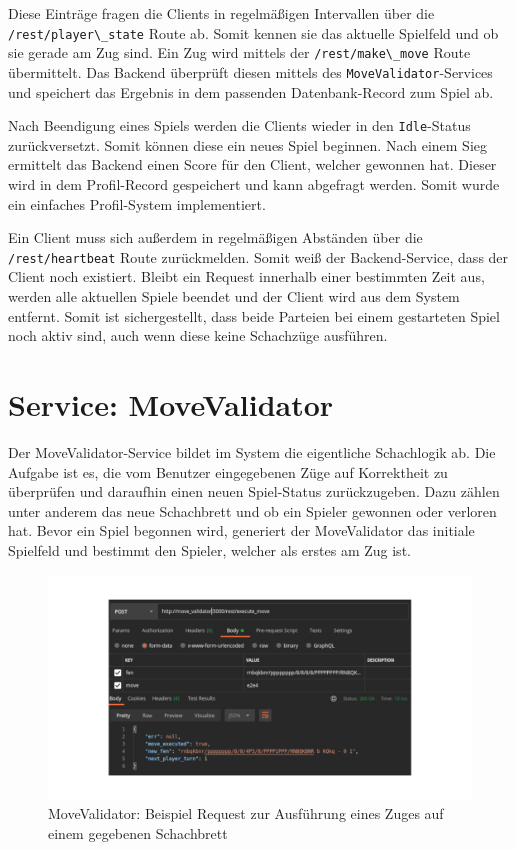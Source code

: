 Diese Einträge fragen die Clients in regelmäßigen Intervallen über die
\passthrough{\lstinline!/rest/player\_state!} Route ab. Somit kennen sie
das aktuelle Spielfeld und ob sie gerade am Zug sind. Ein Zug wird
mittels der \passthrough{\lstinline!/rest/make\_move!} Route
übermittelt. Das Backend überprüft diesen mittels des
\passthrough{\lstinline!MoveValidator!}-Services und speichert das
Ergebnis in dem passenden Datenbank-Record zum Spiel ab.

Nach Beendigung eines Spiels werden die Clients wieder in den
\passthrough{\lstinline!Idle!}-Status zurückversetzt. Somit können diese
ein neues Spiel beginnen. Nach einem Sieg ermittelt das Backend einen
Score für den Client, welcher gewonnen hat. Dieser wird in dem
Profil-Record gespeichert und kann abgefragt werden. Somit wurde ein
einfaches Profil-System implementiert.

Ein Client muss sich außerdem in regelmäßigen Abständen über die
\passthrough{\lstinline!/rest/heartbeat!} Route zurückmelden. Somit weiß
der Backend-Service, dass der Client noch existiert. Bleibt ein Request
innerhalb einer bestimmten Zeit aus, werden alle aktuellen Spiele
beendet und der Client wird aus dem System entfernt. Somit ist
sichergestellt, dass beide Parteien bei einem gestarteten Spiel noch
aktiv sind, auch wenn diese keine Schachzüge ausführen.

\hypertarget{service-movevalidator}{%
\section{Service: MoveValidator}\label{service-movevalidator}}

Der MoveValidator-Service bildet im System die eigentliche Schachlogik
ab. Die Aufgabe ist es, die vom Benutzer eingegebenen Züge auf
Korrektheit zu überprüfen und daraufhin einen neuen Spiel-Status
zurückzugeben. Dazu zählen unter anderem das neue Schachbrett und ob ein
Spieler gewonnen oder verloren hat. Bevor ein Spiel begonnen wird,
generiert der MoveValidator das initiale Spielfeld und bestimmt den
Spieler, welcher als erstes am Zug ist.

\begin{figure}
\centering
\includegraphics{images/ATC_movevalidator_execute_move.png}
\caption{MoveValidator: Beispiel Request zur Ausführung eines Zuges auf
einem gegebenen Schachbrett \label{ATC_movevalidator_execute_move}}
\end{figure}

